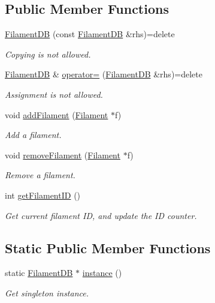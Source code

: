 \subsection*{Public Member Functions}
\begin{DoxyCompactItemize}
\item 
\hyperlink{classFilamentDB_acb05fe726fc30817230fcff03b5ec0fc}{Filament\+D\+B} (const \hyperlink{classFilamentDB}{Filament\+D\+B} \&rhs)=delete
\begin{DoxyCompactList}\small\item\em Copying is not allowed. \end{DoxyCompactList}\item 
\hyperlink{classFilamentDB}{Filament\+D\+B} \& \hyperlink{classFilamentDB_a2f4d08f0f0c699cfafc48ebddc5ea9b6}{operator=} (\hyperlink{classFilamentDB}{Filament\+D\+B} \&rhs)=delete
\begin{DoxyCompactList}\small\item\em Assignment is not allowed. \end{DoxyCompactList}\item 
void \hyperlink{classFilamentDB_a1976958c7b9a4eea369485593ea72373}{add\+Filament} (\hyperlink{classFilament}{Filament} $\ast$f)
\begin{DoxyCompactList}\small\item\em Add a filament. \end{DoxyCompactList}\item 
void \hyperlink{classFilamentDB_ada62057565863d888f97ce10590c56df}{remove\+Filament} (\hyperlink{classFilament}{Filament} $\ast$f)
\begin{DoxyCompactList}\small\item\em Remove a filament. \end{DoxyCompactList}\item 
int \hyperlink{classFilamentDB_a59a564c801c753cd58456dd7c366aecd}{get\+Filament\+I\+D} ()
\begin{DoxyCompactList}\small\item\em Get current filament I\+D, and update the I\+D counter. \end{DoxyCompactList}\end{DoxyCompactItemize}
\subsection*{Static Public Member Functions}
\begin{DoxyCompactItemize}
\item 
static \hyperlink{classFilamentDB}{Filament\+D\+B} $\ast$ \hyperlink{classFilamentDB_a90c6a59bba2f709b3012dae202365996}{instance} ()
\begin{DoxyCompactList}\small\item\em Get singleton instance. \end{DoxyCompactList}\end{DoxyCompactItemize}
